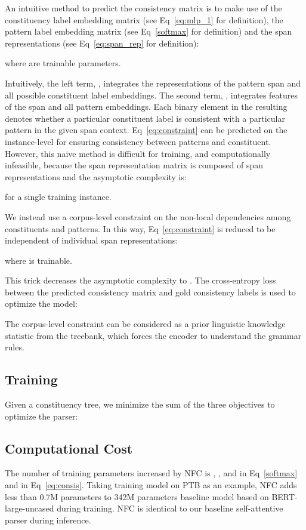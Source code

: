 \documentclass[11pt]{article}
\begin{document}
An intuitive method to predict the consistency matrix  is to make use of the constituency label embedding matrix  (see Eq~\ref{eq:mlp_1} for definition), the pattern label embedding matrix  (see Eq~\ref{softmax} for definition) and the span representations  (see Eq~\ref{eq:span_rep} for definition): 

where  are trainable parameters.


Intuitively, the left term, , integrates the representations of the pattern span and all possible constituent label embeddings. The second term, , integrates features of the span and all pattern embeddings. Each binary element in the resulting  denotes whether a particular constituent label is consistent with a particular pattern in the given span context.
Eq~\ref{eq:constraint} can be predicted on the instance-level for ensuring consistency between patterns and constituent.
However, this naive method is difficult for training, and computationally infeasible, because the span representation matrix  is composed of  span representations  and the asymptotic complexity is:

for a single training instance. 

We instead use a corpus-level constraint on the non-local dependencies among constituents and patterns.
In this way, Eq~\ref{eq:constraint} is reduced to be independent of individual span representations:

where  is trainable. 


This trick decreases the asymptotic complexity to 
.
The cross-entropy loss between the predicted consistency matrix and gold consistency labels is used to optimize the model:


The corpus-level constraint can be considered as a prior linguistic knowledge statistic from the treebank, which forces the encoder to understand the grammar rules.






\subsection{Training}
Given a constituency tree, we minimize the sum of the three objectives to optimize the parser: 


\subsection{Computational Cost}
\label{sec:cost}
The number of training parameters increased by NFC is ,  ,  and  in Eq~\ref{softmax} and  in Eq~\ref{eq:consis}. Taking training model on PTB as an example, NFC adds less than 0.7M parameters to 342M parameters baseline model \cite{san-constituency} based on BERT-large-uncased during training.
NFC is identical to our baseline self-attentive parser \cite{san-constituency} during inference.
\end{document}
